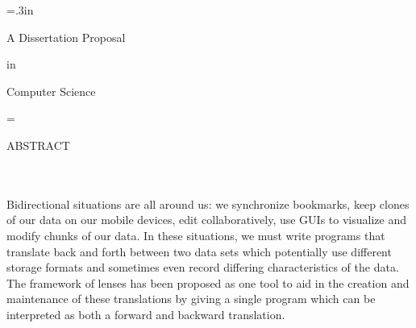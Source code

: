 \doublespaced
\large\newlength{\oldparskip}\setlength\oldparskip{\parskip}\parskip=.3in
\thispagestyle{empty}
\begin{center}
\vspace*{\fill}
\thetitle

\theauthor


A Dissertation Proposal

in

Computer Science
\end{center}


\noindent\singlespaced\large
\phantom{Presented to the Faculties of the University of Pennsylvania in Partial
Fulfillment of the Requirements for the Degree of Doctor of Philosophy}


\doublespaced\large
\begin{center}
\theyear
\end{center}




\vspace*{\fill}

\normalsize\parskip=\oldparskip


\newpage
\doublespaced


\newpage
\begin{center}
  ABSTRACT\\
\thetitle\\
\vspace{.5in}
  \theauthor\\
  \theadvisor
\end{center}

\singlespaced
\noindent

Bidirectional situations are all around us: we synchronize bookmarks, keep
clones of our data on our mobile devices, edit collaboratively, use GUIs to
visualize and modify chunks of our data. In these situations, we must write
programs that translate back and forth between two data sets which
potentially use different storage formats and sometimes even record
differing characteristics of the data. The framework of lenses has been
proposed as one tool to aid in the creation and maintenance of these
translations by giving a single program which can be interpreted as both a
forward and backward translation.

